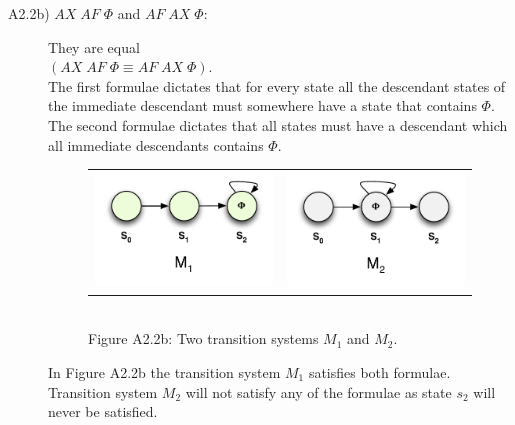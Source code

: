 \documentclass[12pt]{report}
\begin{document}
\begin{description}
	\item[A2.2b) $AX \; AF \; \Phi$ and $AF \; AX \; \Phi$:]
		They are equal\\
		$\left(AX \; AF \; \Phi \equiv AF \; AX \; \Phi\right)$.\\
		The first formulae dictates that for every state all the descendant states of the immediate descendant must somewhere have a state that contains $\Phi$. The second formulae dictates that all states must have a descendant which all immediate descendants contains $\Phi$.
		\begin{figure}[H]
			\centering
			\begin{tabular}{ l r }
				\includegraphics[scale=0.75]{../GFX/Answer-A2-2b-1.pdf}
				& \includegraphics[scale=0.75]{../GFX/Answer-A2-2b-2.pdf}
			\end{tabular}\\
			Figure A2.2b: Two transition systems $M_1$ and $M_2$.
		\end{figure}
		In Figure A2.2b the transition system $M_1$ satisfies both formulae. Transition system $M_2$ will not satisfy any of the formulae as state $s_2$ will never be satisfied.
	

\end{description}
\end{document}
